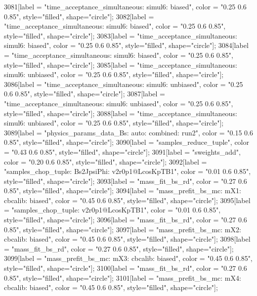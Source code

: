 {	3081[label = "time_acceptance_simultaneous\ntimeacc: simul6\ntrigger: biased", color = "0.25 0.6 0.85", style="filled", shape="circle"];
	3082[label = "time_acceptance_simultaneous\ntimeacc: simul6\ntrigger: biased", color = "0.25 0.6 0.85", style="filled", shape="circle"];
	3083[label = "time_acceptance_simultaneous\ntimeacc: simul6\ntrigger: biased", color = "0.25 0.6 0.85", style="filled", shape="circle"];
	3084[label = "time_acceptance_simultaneous\ntimeacc: simul6\ntrigger: biased", color = "0.25 0.6 0.85", style="filled", shape="circle"];
	3085[label = "time_acceptance_simultaneous\ntimeacc: simul6\ntrigger: unbiased", color = "0.25 0.6 0.85", style="filled", shape="circle"];
	3086[label = "time_acceptance_simultaneous\ntimeacc: simul6\ntrigger: unbiased", color = "0.25 0.6 0.85", style="filled", shape="circle"];
	3087[label = "time_acceptance_simultaneous\ntimeacc: simul6\ntrigger: unbiased", color = "0.25 0.6 0.85", style="filled", shape="circle"];
	3088[label = "time_acceptance_simultaneous\ntimeacc: simul6\ntrigger: unbiased", color = "0.25 0.6 0.85", style="filled", shape="circle"];
	3089[label = "physics_params_data_Bs\nfit: auto\ntrigger: combined\nyear: run2", color = "0.15 0.6 0.85", style="filled", shape="circle"];
	3090[label = "samples_reduce_tuple", color = "0.43 0.6 0.85", style="filled", shape="circle"];
	3091[label = "sweights_add", color = "0.20 0.6 0.85", style="filled", shape="circle"];
	3092[label = "samples_chop_tuple\nmode: Bs2JpsiPhi\nversion: v2r0p1@LcosKpTB1", color = "0.01 0.6 0.85", style="filled", shape="circle"];
	3093[label = "mass_fit_bs_rd", color = "0.27 0.6 0.85", style="filled", shape="circle"];
	3094[label = "mass_prefit_bs_mc\nmassbin: mX1\nmassmodel: cbcalib\ntrigger: biased", color = "0.45 0.6 0.85", style="filled", shape="circle"];
	3095[label = "samples_chop_tuple\nversion: v2r0p1@LcosKpTB1", color = "0.01 0.6 0.85", style="filled", shape="circle"];
	3096[label = "mass_fit_bs_rd", color = "0.27 0.6 0.85", style="filled", shape="circle"];
	3097[label = "mass_prefit_bs_mc\nmassbin: mX2\nmassmodel: cbcalib\ntrigger: biased", color = "0.45 0.6 0.85", style="filled", shape="circle"];
	3098[label = "mass_fit_bs_rd", color = "0.27 0.6 0.85", style="filled", shape="circle"];
	3099[label = "mass_prefit_bs_mc\nmassbin: mX3\nmassmodel: cbcalib\ntrigger: biased", color = "0.45 0.6 0.85", style="filled", shape="circle"];
	3100[label = "mass_fit_bs_rd", color = "0.27 0.6 0.85", style="filled", shape="circle"];
	3101[label = "mass_prefit_bs_mc\nmassbin: mX4\nmassmodel: cbcalib\ntrigger: biased", color = "0.45 0.6 0.85", style="filled", shape="circle"];
}
